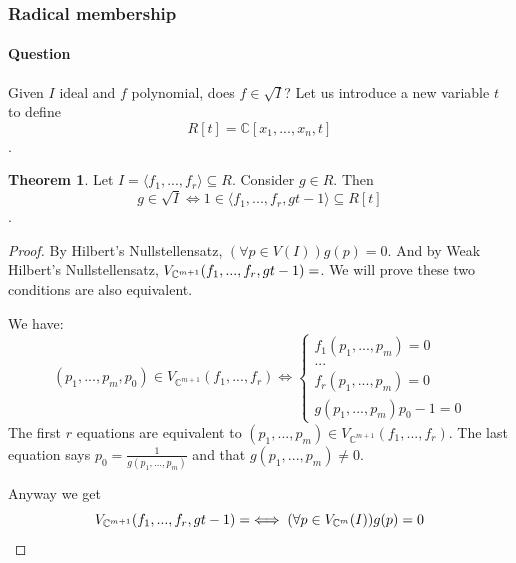 \documentclass{article}
\theoremstyle{definition}
\newtheorem{thm}{Theorem}
\newcommand{\C}{\mathbb{C}}
\begin{document}
\subsubsection{Radical membership}
\paragraph{Question} Given $I$ ideal and $f$ polynomial, does $f\in \sqrt I$?
Let us introduce a new variable $t$ to define $$R[t]=\C[x_1,...,x_n,t]$$.
\begin{thm}
	Let $I=\langle f_1,...,f_r\rangle\subseteq R$. Consider $g\in R$. Then $$g\in \sqrt I\iff 1\in\langle f_1,...,f_r,gt-1\rangle\subseteq R[t]$$.
\end{thm}
\begin{proof}
	By Hilbert's Nullstellensatz, $(\forall p\in V(I))g(p)=0$. And by Weak Hilbert's Nullstellensatz, $V_{\C^{m+1}}(f_1,...,f_r,gt-1)=\empty$. We will prove these two conditions are also equivalent.\par
	We have:
	$$
	(p_1,...,p_m,p_0)\in V_{\C^{m+1}}(f_1,...,f_r)\iff
	\begin{cases}
		f_1(p_1,...,p_m)=0\\
		...\\
		f_r(p_1,...,p_m)=0\\
		g(p_1,...,p_m)p_0-1=0
	\end{cases}
	$$
	The first $r$ equations are equivalent to $(p_1,...,p_m)\in V_{\C^{m+1}}(f_1,...,f_r)$. The last equation says $p_0=\frac{1}{g(p_1,...,p_m)}$ and that $g(p_1,...,p_m)\neq0$.\par
	Anyway we get
	$$
	V_{\C^{m+1}}(f_1,...,f_r,gt-1)=\empty\iff(\forall p\in V_{\C^m}(I))g(p)=0
	$$
\end{proof}
\end{document}
